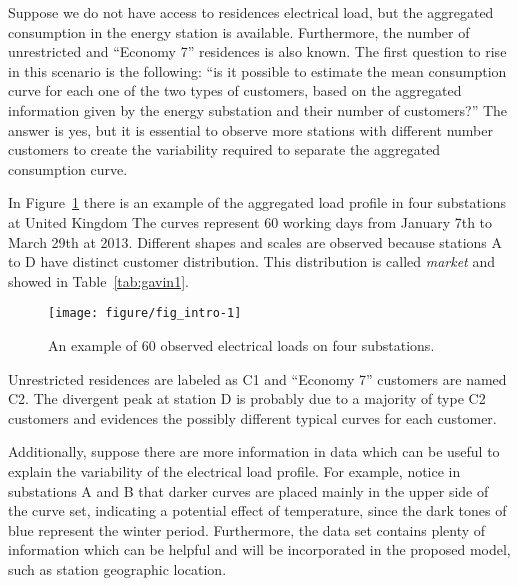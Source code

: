 Suppose we do not have access to residences electrical load, but the aggregated consumption in the energy station is available. Furthermore, the number of unrestricted and ``Economy 7'' residences is also known. The first question to rise in this scenario is the following: ``is it possible to estimate the mean consumption curve for each one of the two types of customers, based on the aggregated information given by the energy substation and their number of customers?'' The answer is yes, but it is essential to observe more stations with different number customers to create the variability required to separate the aggregated consumption curve. 

In Figure~\ref{fig:gavin1} there is an example of the aggregated load profile in four substations at United Kingdom%
The curves represent 60 working days from January 7th to March 29th at 2013. Different shapes and scales are observed because stations A to D have distinct customer distribution. This  distribution is called \textit{market} and showed in Table~\ref{tab:gavin1}.

\begin{figure}
\begin{knitrout}
\color{fgcolor}

{\centering \texttt{[image: figure/fig\_intro-1]} 

}



\end{knitrout}
    \caption{An example of 60 observed electrical loads on four substations.}
    \label{fig:gavin1}
\end{figure}

Unrestricted residences are labeled as C1 and ``Economy 7'' customers are named C2. The divergent peak at station D is probably due to a majority of type C2 customers and evidences the possibly different typical curves for each customer.

Additionally, suppose there are more information in data which can be useful to explain the variability of the electrical load profile. For example, notice in substations A and B that darker curves are placed mainly in the upper side of the curve set, indicating a potential effect of temperature, since the dark tones of blue represent the winter period. Furthermore, the data set contains plenty of information which can be helpful and will be incorporated in the proposed model, such as station geographic location.


